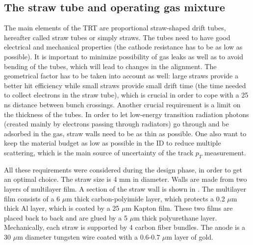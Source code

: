 
\subsection{The straw tube and operating gas mixture}

The main elements of the TRT are proportional straw-shaped drift tubes, hereafter called straw tubes or simply straws.
The tubes need to have good electrical and mechanical properties (the cathode resistance has to be as low as possible). It is important to minimize possibility of gas leaks as well as to avoid bending of the tubes, which will lead to changes in the alignment.
The geometrical factor has to be taken into account as well: large straws provide a better hit efficiency while small straws provide small drift time (the time needed to collect electrons in the straw tube), which is crucial in order to cope with a 25 ns distance between bunch crossings.
Another crucial requirement is a limit on the thickness of the tubes. 
In order to let low-energy transition radiation photons (created mainly by electrons passing through radiators) go through and be adsorbed in the gas, straw walls need to be as thin as possible.
One also want to keep the material budget as low as possible in the ID to reduce multiple scattering,
which is the main source of uncertainty of the track $p_T$ measurement.

All these requirements were considered during the design phase, in order to get an optimal choice.
The straw size is 4 mm in diameter. Walls are made from two layers of multilayer film. A section of the straw wall is shown in .
The multilayer film consists of a 6 $\mu$m thick carbon-polyimide layer, which protects a 0.2 $\mu$m thick Al layer, which is coated by a 25 $\mu$m Kapton film.
These two films are placed back to back and are glued by a 5 $\mu$m thick polyurethane layer.
Mechanically, each straw is supported by 4 carbon fiber bundles.
The anode is a 30 $\mu$m diameter tungsten wire coated with a 0.6-0.7 $\mu$m layer of gold.

